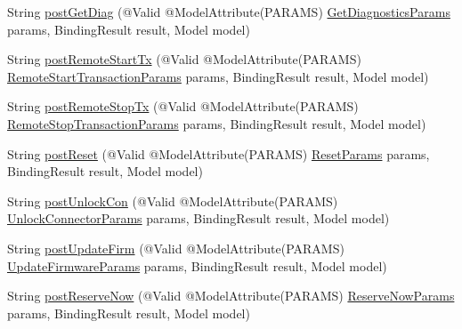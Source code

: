 \begin{DoxyCompactItemize}
\item 
String \hyperlink{classde_1_1rwth_1_1idsg_1_1steve_1_1web_1_1controller_1_1_ocpp15_controller_ad0c3f0e72697bc9baca7bc6dd57275dc}{post\-Get\-Diag} (@Valid @Model\-Attribute(P\-A\-R\-A\-M\-S) \hyperlink{classde_1_1rwth_1_1idsg_1_1steve_1_1web_1_1dto_1_1common_1_1_get_diagnostics_params}{Get\-Diagnostics\-Params} params, Binding\-Result result, Model model)
\item 
String \hyperlink{classde_1_1rwth_1_1idsg_1_1steve_1_1web_1_1controller_1_1_ocpp15_controller_a9b34f99c6d11adc2426100bdaa5a7dc4}{post\-Remote\-Start\-Tx} (@Valid @Model\-Attribute(P\-A\-R\-A\-M\-S) \hyperlink{classde_1_1rwth_1_1idsg_1_1steve_1_1web_1_1dto_1_1common_1_1_remote_start_transaction_params}{Remote\-Start\-Transaction\-Params} params, Binding\-Result result, Model model)
\item 
String \hyperlink{classde_1_1rwth_1_1idsg_1_1steve_1_1web_1_1controller_1_1_ocpp15_controller_aa1de25b8d1bc7ec176f5101cddd9b8a7}{post\-Remote\-Stop\-Tx} (@Valid @Model\-Attribute(P\-A\-R\-A\-M\-S) \hyperlink{classde_1_1rwth_1_1idsg_1_1steve_1_1web_1_1dto_1_1common_1_1_remote_stop_transaction_params}{Remote\-Stop\-Transaction\-Params} params, Binding\-Result result, Model model)
\item 
String \hyperlink{classde_1_1rwth_1_1idsg_1_1steve_1_1web_1_1controller_1_1_ocpp15_controller_ac47fd9bffaa0ee91838e94d3dde7c089}{post\-Reset} (@Valid @Model\-Attribute(P\-A\-R\-A\-M\-S) \hyperlink{classde_1_1rwth_1_1idsg_1_1steve_1_1web_1_1dto_1_1ocpp12_1_1_reset_params}{Reset\-Params} params, Binding\-Result result, Model model)
\item 
String \hyperlink{classde_1_1rwth_1_1idsg_1_1steve_1_1web_1_1controller_1_1_ocpp15_controller_a8ee35af8c62aaece684c921ac178111e}{post\-Unlock\-Con} (@Valid @Model\-Attribute(P\-A\-R\-A\-M\-S) \hyperlink{classde_1_1rwth_1_1idsg_1_1steve_1_1web_1_1dto_1_1common_1_1_unlock_connector_params}{Unlock\-Connector\-Params} params, Binding\-Result result, Model model)
\item 
String \hyperlink{classde_1_1rwth_1_1idsg_1_1steve_1_1web_1_1controller_1_1_ocpp15_controller_acf67a745349c25372232d980f3bdfc4f}{post\-Update\-Firm} (@Valid @Model\-Attribute(P\-A\-R\-A\-M\-S) \hyperlink{classde_1_1rwth_1_1idsg_1_1steve_1_1web_1_1dto_1_1common_1_1_update_firmware_params}{Update\-Firmware\-Params} params, Binding\-Result result, Model model)
\item 
String \hyperlink{classde_1_1rwth_1_1idsg_1_1steve_1_1web_1_1controller_1_1_ocpp15_controller_a698e883adcaf3b4f165340d90ee84c2b}{post\-Reserve\-Now} (@Valid @Model\-Attribute(P\-A\-R\-A\-M\-S) \hyperlink{classde_1_1rwth_1_1idsg_1_1steve_1_1web_1_1dto_1_1ocpp15_1_1_reserve_now_params}{Reserve\-Now\-Params} params, Binding\-Result result, Model model)

\end{DoxyCompactItemize}
